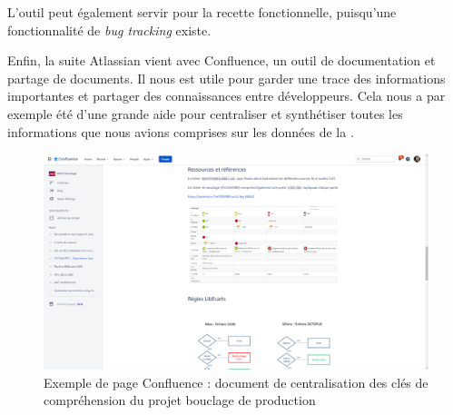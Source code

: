 L'outil peut également servir pour la recette fonctionnelle, puisqu'une fonctionnalité de \textit{bug tracking} existe.

Enfin, la suite Atlassian vient avec Confluence, un outil de documentation et partage de documents. Il nous est utile pour garder une trace des informations importantes et partager des connaissances entre développeurs. Cela nous a par exemple été d'une grande aide pour centraliser et synthétiser toutes les informations que nous avions comprises sur les données de la \sncf.

  \begin{figure}[H]
    \centering
    \includegraphics[width=1\linewidth]{img/confluence_sycomores_explications.png}
    \caption{Exemple de page Confluence : document de centralisation des clés de compréhension du projet bouclage de production}
  \end{figure}